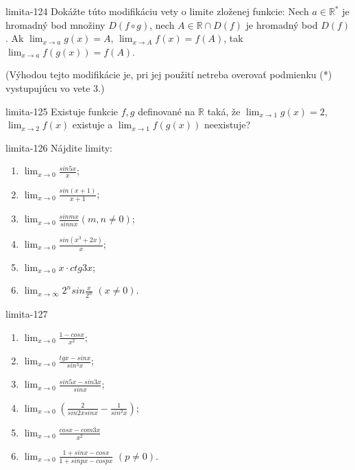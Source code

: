 \begin{defproblem}{limita-124}
Dokážte túto modifikáciu vety o limite zloženej funkcie: Nech $a \in \mathbb{R^*}$ je hromadný bod množiny $D(f \circ g)$, nech $A \in \mathbb{R}\cap D(f)$ je hromadný bod $D(f)$. Ak $\lim_{x \rightarrow a} g(x)=A$, $\lim_{x \rightarrow A} f(x)=f(A)$, tak $\lim_{x \rightarrow a} f(g(x))=f(A)$.

(Výhodou tejto modifikácie je, pri jej použití netreba overovať podmienku (*) vystupujúcu vo vete $3$.)
\end{defproblem}

\begin{defproblem}{limita-125}
Existuje funkcie $f,g$ definované na $\mathbb{R}$ taká, že $\lim_{x \rightarrow 1} g(x)=2$, $\lim_{x \rightarrow 2} f(x)$ existuje a $\lim_{x \rightarrow 1} f(g(x))$ neexistuje?
\end{defproblem}

\begin{defproblem}{limita-126}
Nájdite limity:
\begin{multicols}{2}
\begin{enumerate}
    \item $\lim_{x \rightarrow 0} \frac{sin 5x}{x}$;
    \item $\lim_{x \rightarrow 0} \frac{sin (x+1)}{x+1}$;
    \item $\lim_{x \rightarrow 0}  \frac{sin mx}{sin nx} (m,n \neq 0)$;
    \item $\lim_{x \rightarrow 0} \frac{sin (x^3+2x)}{x}$;
    \item $\lim_{x \rightarrow 0} x \cdot ctg 3x$;
    \item $\lim_{x \rightarrow \infty} 2^n sin \frac{x}{2^n}$  $(x \neq 0)$.
\end{enumerate}
\end{multicols}
\end{defproblem}

\begin{defproblem}{limita-127}
\begin{multicols}{2}
\begin{enumerate}
    \item $\lim_{{x \rightarrow 0}} \frac{1-cos x}{x^2}$;
    \item $\lim_{{x \rightarrow 0}} \frac{tg x-sin x}{sin ^3 x}$;
    \item $\lim_{{x \rightarrow 0}}  \frac{sin 5x-sin 3x}{sin x}$;
    \item $\lim_{{x \rightarrow 0}} (\frac{2}{sin 2x sin x}-\frac{1}{sin ^2 x})$;
    \item $\lim_{{x \rightarrow 0}} \frac{cos x - com 3x}{x^2} $
    \item $\lim_{x \rightarrow 0} \frac{1+sin x - cos x}{1+ sin px - cos px}$  $(p \neq 0)$.
\end{enumerate}
\end{multicols}
\end{defproblem}

